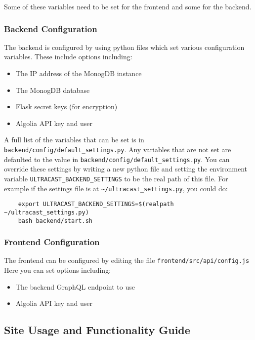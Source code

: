 \documentclass[../report.tex]{subfiles}
\begin{document}
Some of these variables need to be set for the frontend and some for the backend.

\subsubsection{Backend Configuration}

The backend is configured by using python files which set various configuration variables. These include options including:
\begin{itemize}
    \item The IP address of the MonogDB instance
    \item The MonogDB database
    \item Flask secret keys (for encryption)
    \item Algolia API key and user
\end{itemize}
A full list of the variables that can be set is in \verb|backend/config/default_settings.py|.
%
Any variables that are not set are defaulted to the value in \verb|backend/config/default_settings.py|.
You can override these settings by writing a new python file and setting the environment variable \verb|ULTRACAST_BACKEND_SETTINGS| to be the real path of this file. 
For example if the settings file is at \verb|~/ultracast_settings.py|, you could do:

\begin{verbatim}
    export ULTRACAST_BACKEND_SETTINGS=$(realpath ~/ultracast_settings.py)
    bash backend/start.sh
\end{verbatim}

\subsubsection{Frontend Configuration}

The frontend can be configured by editing the file \verb|frontend/src/api/config.js| Here you can set options including:
\begin{itemize}
    \item The backend GraphQL endpoint to use
    \item Algolia API key and user
\end{itemize}

\subsection{Site Usage and Functionality Guide}


\end{document}
